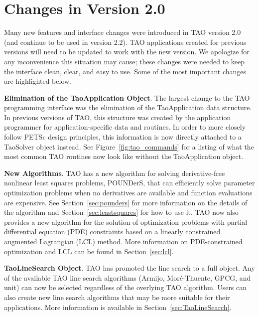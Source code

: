 \section*{Changes in Version 2.0}

Many new features and interface changes were introduced in TAO version 2.0 (and continue to be used in version 2.2).
TAO applications created for previous versions will need to be updated to 
work with the new version.  We apologize for any inconvenience this situation
may cause; these changes were needed to keep the interface
clean, 
clear, and easy to use. Some of the most important changes are highlighted 
below.

\vspace{7mm}
\noindent \textbf{Elimination of the TaoApplication Object}. The largest change to the TAO programming interface was the elimination of the
TaoApplication data structure. In previous versions of TAO, this structure was 
created by the application programmer for application-specific data and 
routines.  In order to more closely follow PETSc design principles, this 
information is now directly attached to a TaoSolver object instead.  See 
Figure~\ref{fig:tao_commands} for a listing of what the most common TAO 
routines now look like without the TaoApplication object.

\vspace{7mm}
\noindent \textbf{New Algorithms}. TAO has a new algorithm for solving derivative-free nonlinear least
squares
problems, POUNDerS, that can efficiently solve parameter optimization problems 
when no derivatives are available and function evaluations are expensive. 
See 
Section~\ref{sec:pounders} for more information on the details of the 
algorithm and Section~\ref{sec:leastsquares} for how to use it.
TAO now also provides a new algorithm for the solution of optimization
problems with partial differential equation (PDE) constraints based on a
linearly constrained augmented Lagrangian (LCL) method.  More 
information on PDE-constrained optimization and LCL can be found 
in Section~\ref{sec:lcl}.


\vspace{7mm}
\noindent \textbf{TaoLineSearch Object}. TAO has promoted the line search to a full object.  Any of the available 
TAO line search algorithms (Armijo, Mor\'e-Thuente, GPCG, and unit) can now 
be selected regardless of the overlying TAO algorithm.  Users can also
create new line search algorithms that may be more suitable for their
applications.  More information is available in 
Section~\ref{sec:TaoLineSearch}.


